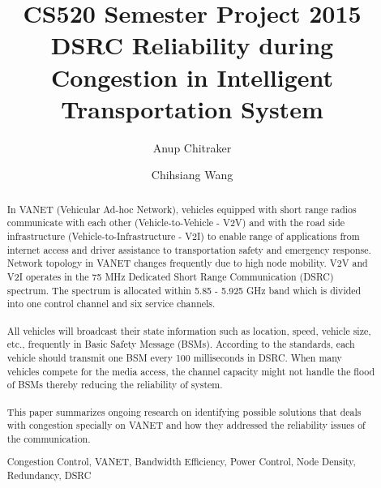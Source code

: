 \documentclass[runningheads,a4paper]{llncs}
\newcommand{\keywords}[1]{\par\addvspace\baselineskip
\noindent\keywordname\enspace\ignorespaces#1}
\begin{document}
\mainmatter  %

\title{CS520 Semester Project 2015 \\ DSRC Reliability during Congestion in Intelligent Transportation System}



\author{
Anup Chitraker
\and
Chihsiang Wang\\
}
%


\maketitle


\begin{abstract}
In VANET (Vehicular Ad-hoc Network), vehicles equipped with short range radios communicate with each other (Vehicle-to-Vehicle - V2V) and with the  road side infrastructure (Vehicle-to-Infrastructure - V2I) to enable range of applications from internet access and driver assistance to transportation safety and emergency response. Network topology in VANET changes frequently due to high node mobility. V2V and V2I operates in the 75 MHz Dedicated Short Range Communication (DSRC) spectrum. The spectrum is allocated within 5.85 - 5.925 GHz band which is divided into one control channel and six service channels.
\\
\\
All vehicles will broadcast their state information such as location, speed, vehicle size, etc., frequently in Basic Safety Message (BSMs). According to the standards, each vehicle should transmit one BSM every 100 milliseconds in DSRC. When many vehicles compete for the media access, the channel capacity might not handle the flood of BSMs thereby reducing the reliability of system.
\\
\\
This paper summarizes ongoing research on identifying possible solutions that deals with congestion specially on VANET and how they addressed the reliability issues of the communication.

\keywords{Congestion Control, VANET, Bandwidth Efficiency, Power Control, Node Density, Redundancy, DSRC}
\end{abstract}
\end{document}
